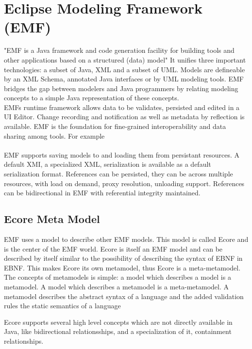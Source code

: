 \chapter{Eclipse Modeling Framework (EMF)}
"EMF is a Java framework and code generation facility for building tools and other applications based on a structured (data) model"\cite{EMFDoc}
 It unifies three important technologies: a subset of Java, XML and a subset of UML. Models are defineable by an XML Schema, annotated Java interfaces or by UML modeling tools. EMF bridges the gap between modelers and Java programmers by relating modeling concepts to a simple Java representation of these concepts.\cite{EMF2nd}\\

EMFs runtime framework allows data to be validates, persisted and edited in a UI Editor. Change recording and notification as well as metadata by reflection is available. EMF is the foundation for fine-grained interoperability and data sharing among tools. For example 
\\ \\

EMF supports saving models to and loading them from persistant resources. A default XMI, a specialized XML, serialization is available as a default serialization format. References can be persisted, they can be across multiple resources, with load on demand, proxy resolution, unloading support. References can be bidirectional in EMF with referential integrity maintained. \cite{EMF2nd}\\

\section{Ecore Meta Model}
EMF uses a model to describe other EMF models. This model is called Ecore and is the center of the EMF world. Ecore is itself an EMF model and can be described by itself similar to the possibility of describing the syntax of EBNF in EBNF. This makes Ecore its own metamodel, thus Ecore is a meta-metamodel. The concepts of metamodels is simple: a model which describes a model is a metamodel. A model which describes a metamodel is a meta-metamodel. \cite{EMF2nd}  A metamodel describes the abstract syntax of a language \cite{EMP} and the added validation rules the static semantics of a language \cite{MDSD}

Ecore supports several high level concepts which are not directly available in Java, like bidirectional relationsships, and a specialization of it, containment relationships.

